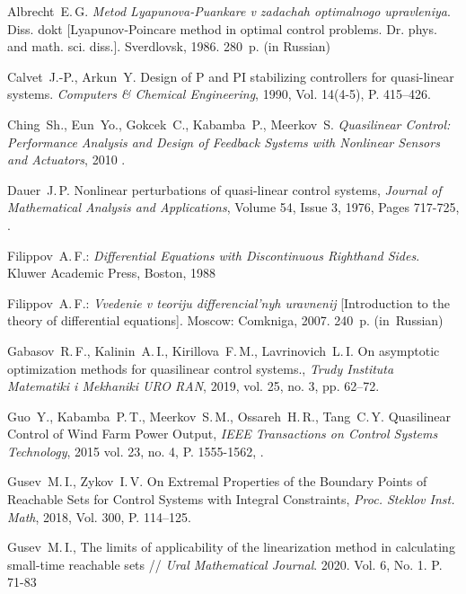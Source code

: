 \documentclass[../main.tex]{subfiles}
\begin{document}
\begin{thebibliography}{99}
Albrecht~E.\,G. \emph{Metod Lyapunova-Puankare v zadachah optimalnogo upravleniya}. Diss.
dokt [Lyapunov-Poincare method in optimal control problems. Dr. phys. and math. sci. diss.].
Sverdlovsk, 1986. 280~p. (in Russian)

Calvet~J.-P., Arkun~Y. Design of P and PI stabilizing controllers for quasi-linear systems. \emph{Computers \& Chemical Engineering}, 1990, Vol. 14(4-5), P. 415–426. 

Ching~Sh., Eun~Yo., Gokcek~C., Kabamba~P., Meerkov~S. \emph{Quasilinear Control: Performance Analysis and Design of Feedback Systems with Nonlinear Sensors and Actuators}, 2010 . 

Dauer~J.\,P. Nonlinear perturbations of quasi-linear control systems,
\emph{Journal of Mathematical Analysis and Applications},
Volume 54, Issue 3,
1976,
Pages 717-725,
.

Filippov~A.\,F.: \emph{Differential Equations with Discontinuous Righthand Sides}. Kluwer Academic Press, Boston, 1988

Filippov~A.\,F.: \emph{Vvedenie v teoriju differencial'nyh uravnenij} [Introduction to the theory of differential equations]. Moscow: Comkniga, 2007. 240~p. (in~Russian)

Gabasov~R.\,F., Kalinin~A.\,I.,  Kirillova~F.\,M., Lavrinovich~L.\,I. On asymptotic optimization methods for quasilinear control systems., \emph{Trudy Instituta Matematiki i Mekhaniki URO
	RAN}, 2019, vol. 25, no. 3, pp. 62–72.

Guo~Y., Kabamba~P.\,T., Meerkov~S.\,M.,  Ossareh~H.\,R., Tang~C.\,Y. Quasilinear Control of Wind Farm Power Output, \emph{IEEE Transactions on Control Systems Technology}, 2015 vol. 23, no. 4, P. 1555-1562,  .


Gusev~M.\,I., Zykov~I.\,V. On Extremal Properties of the Boundary Points of Reachable Sets for Control Systems with Integral Constraints, \emph{Proc. Steklov Inst. Math}, 2018, Vol. 300, P. 114--125. 

Gusev~M.\,I., The limits of applicability of the linearization method in calculating small-time reachable sets // \emph{Ural Mathematical Journal}. 2020. Vol. 6, No. 1. P. 71-83



\end{thebibliography}
\end{document}
